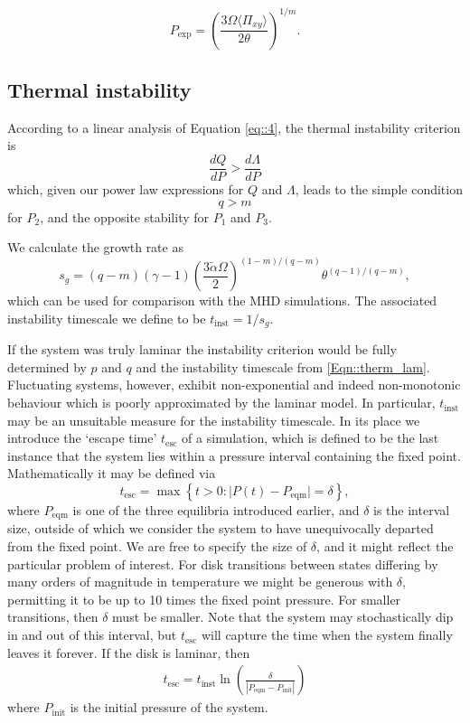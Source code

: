 \documentclass[useAMS]{mn2e}
\begin{document}
\begin{equation}
P_{\text{exp}}=\left(\frac{3\Omega\langle \Pi_{xy}\rangle}{2\theta}\right)^{1/m}.
\label{Eqn::pexp}
\end{equation}

\subsection{Thermal instability}\label{Sec::Instab}

According to a linear analysis of Equation \eqref{eq::4}, 
the thermal instability criterion is 
\begin{equation}
\frac{dQ}{dP}>\frac{d\Lambda}{dP}
\end{equation}
which, given our power law expressions for $Q$ and $\Lambda$, 
leads to the simple condition $$q>m$$ for $P_{2}$, and the opposite
stability for $P_{1}$ and $P_3$. 

We calculate the growth rate as
\begin{equation}
s_g=(q-m)(\gamma-1)\left(\frac{3\tilde{\alpha}\Omega}{2}\right)^{(1-m)/(q-m)}\theta^{(q-1)/(q-m)},
\label{Eqn::therm_lam}
\end{equation} 
which can be used for comparison with the MHD simulations. The
associated instability timescale we define to be $t_{\text{inst}} =1/s_g$. 

If the system was truly laminar the instability criterion would be
fully determined by $p$ and $q$ and the instability
timescale from \eqref{Eqn::therm_lam}. Fluctuating systems, however,
exhibit non-exponential and indeed non-monotonic behaviour which is
poorly approximated by the laminar model. In particular, $t_{\text{inst}}$ may
be an unsuitable measure for the instability timescale. In its place we introduce
the `escape time' $t_{\text{esc}}$ of a simulation, 
which is defined to be the last instance that the system lies within a
pressure interval containing the fixed point. 
Mathematically it may be defined via
\begin{equation}
t_{\text{esc}}=\max\left\lbrace t>0 : \vert P(t)-P_{\text{eqm}}\vert=\delta\right\rbrace,
\label{Eqn::Tesc}
\end{equation}
where $P_{\text{eqm}}$ is one of the three equilibria introduced
earlier, and $\delta$ is the interval size, outside of which we
consider the system to have unequivocally departed from the fixed
point. We are free to specify the size of $\delta$, and it might
reflect the particular problem of interest. For disk transitions
between states differing by many orders of magnitude in temperature
we might be generous with $\delta$, permitting it to be up to 10 times
the fixed point pressure. For smaller transitions, then $\delta$ must
be smaller.
Note that the  system may stochastically dip in and out of this interval, but
$t_{\text{esc}}$ will capture the time when the system finally leaves it forever.
If the disk is laminar, then 
\begin{align}
 t_{\text{esc}}=t_{\text{inst}}\ln\left(\frac{\delta}{|P_{\text{eqm}}-P_{\text{init}}|}\right) 
\end{align}
where $P_{\text{init}}$ is the
initial pressure of the system.
\end{document}
